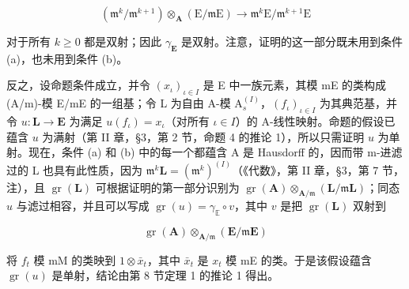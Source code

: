 \[
\left(\mathfrak {m} ^ {k} / \mathfrak {m} ^ {k + 1}\right) \otimes_ {\mathbf {A}} (\mathrm{E} / \mathfrak {m} \mathrm{E}) \rightarrow \mathfrak {m} ^ {k} \mathrm{E} / \mathfrak {m} ^ {k + 1} \mathrm{E}
\]

	对于所有 \(k \geqslant 0\) 都是双射；因此 \(\gamma_{\mathbf{E}}\) 是双射。注意，证明的这一部分既未用到条件 (a)，也未用到条件 (b)。

	反之，设命题条件成立，并令 \((x_{\iota})_{\iota \in I}\) 是 E 中一族元素，其模 mE 的类构成 (A/m)-模 E/mE 的一组基；令 L 为自由 A-模 \(\mathrm{A}_s^{(I)}\)，\((f_{\iota})_{\iota \in I}\) 为其典范基，并令 \(u: \mathbf{L} \to \mathbf{E}\) 为满足 \(u(f_{\iota}) = x_{\iota}\)（对所有 \(\iota \in I\)）的 A-线性映射。命题的假设已蕴含 \(u\) 为满射（第 II 章，§3，第 2 节，命题 4 的推论 1），所以只需证明 \(u\) 为单射。现在，条件 (a) 和 (b) 中的每一个都蕴含 A 是 Hausdorff 的，因而带 m-进滤过的 L 也具有此性质，因为 \(\mathfrak{m}^k\mathbf{L} = (\mathfrak{m}^k)^{(I)}\)（《代数》，第 II 章，§3，第 7 节，注），且 \(\operatorname{gr}(\mathbf{L})\) 可根据证明的第一部分识别为 \(\operatorname{gr}(\mathbf{A}) \otimes_{\mathbf{A} / \mathfrak{m}} (\mathbf{L} / \mathfrak{m}\mathbf{L})\)；同态 \(u\) 与滤过相容，并且可以写成 \(\operatorname{gr}(u) = \gamma_{\mathbb{E}} \circ v\)，其中 \(v\) 是把 \(\operatorname{gr}(\mathbf{L})\) 双射到

\[
\operatorname{gr} (\mathbf {A}) \otimes_ {\mathbf {A} / \mathfrak {m}} (\mathbf {E} / \mathfrak {m} \mathbf {E})
\]

	将 \(f_{t}\) 模 mM 的类映到 \(1 \otimes \bar{x}_{t}\)，其中 \(\bar{x}_{t}\) 是 \(x_{t}\) 模 mE 的类。于是该假设蕴含 \(\operatorname{gr}(u)\) 是单射，结论由第 8 节定理 1 的推论 1 得出。

